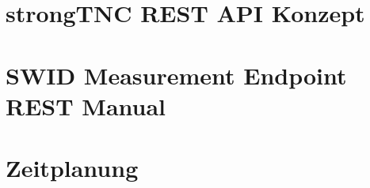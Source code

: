 

\section{strongTNC REST API Konzept}
\label{REST:api-konzept}


\section{SWID Measurement Endpoint REST Manual}
\label{REST:swid-measurement-manual}


\section{Zeitplanung}
\label{anhang:zeitplanung}


